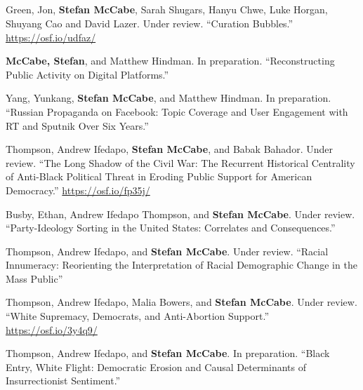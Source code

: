 \documentclass[11pt, letter]{article}
\begin{document}
\subsection*{} %
\vspace{-6mm} %
\begin{hangparas}{.25in}{1}

Green, Jon,\textsuperscript{\textdagger} \textbf{Stefan McCabe},\textsuperscript{\textdagger} Sarah Shugars, Hanyu Chwe, Luke Horgan, Shuyang Cao and David Lazer. Under review. ``Curation Bubbles.'' \href{https://osf.io/udfaz/}{https://osf.io/udfaz/} \vspace{2mm}

\textbf{McCabe, Stefan}, and Matthew Hindman. In preparation. ``Reconstructing Public Activity on Digital Platforms.'' \vspace{2mm}

Yang, Yunkang, \textbf{Stefan McCabe}, and Matthew Hindman. In preparation. ``Russian Propaganda on Facebook: Topic Coverage and User Engagement with RT and Sputnik Over Six Years.'' \vspace{2mm}

Thompson, Andrew Ifedapo, \textbf{Stefan McCabe}, and Babak Bahador. Under review. ``The Long Shadow of the Civil War: The Recurrent Historical Centrality of Anti-Black Political Threat in Eroding Public Support for American Democracy.'' \href{https://osf.io/fp35j/}{https://osf.io/fp35j/} \vspace{2mm}

Busby, Ethan, Andrew Ifedapo Thompson, and \textbf{Stefan McCabe}. Under review. ``Party-Ideology Sorting in the United States: Correlates and Consequences.'' \vspace{2mm}

Thompson, Andrew Ifedapo, and \textbf{Stefan McCabe}. Under review. ``Racial Innumeracy: Reorienting the Interpretation of Racial Demographic Change in the Mass Public''  \vspace{2mm}

Thompson, Andrew Ifedapo, Malia Bowers, and \textbf{Stefan McCabe}. Under review. ``White Supremacy, Democrats, and Anti-Abortion Support.'' \href{https://osf.io/3y4q9/}{https://osf.io/3y4q9/} \vspace{2mm}

Thompson, Andrew Ifedapo, and \textbf{Stefan McCabe}. In preparation. ``Black Entry, White Flight: Democratic Erosion and Causal Determinants of Insurrectionist Sentiment.''  \vspace{2mm}



\end{hangparas}
\end{document}
